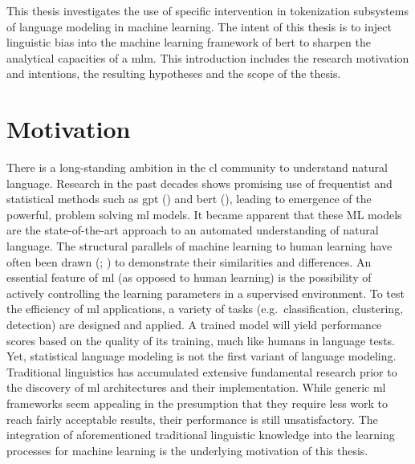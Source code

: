 
This thesis investigates the use of specific intervention in tokenization subsystems of language modeling in machine learning.
The intent of this thesis is to inject linguistic bias into the machine learning framework of \ac{bert} to sharpen the analytical capacities of a \ac{mlm}.
This introduction includes the research motivation and intentions, the resulting hypotheses and the scope of the thesis.

\section{Motivation}
\label{sec:motivation}
There is a long-standing ambition in the \acf{cl} community to understand natural language.
Research in the past decades shows promising use of frequentist and statistical methods such as \ac{gpt} (\cite{gpt}) and \ac{bert} (\cite{ATTENTION}), leading to emergence of the powerful, problem solving \ac{ml} models.
It became apparent that these ML models are the state-of-the-art approach to an automated understanding of natural language.
The structural parallels of machine learning to human learning have often been drawn (\textcite{humanmachinelearning1}; \textcite{humanmachinelearning2}) to demonstrate their similarities and differences.
An essential feature of \ac{ml} (as opposed to human learning) is the possibility of actively controlling the learning parameters in a supervised environment.
To test the efficiency of  \ac{ml} applications, a variety of tasks (e.g.\ classification, clustering, detection) are designed and applied.
A trained model will yield performance scores based on the quality of its training, much like humans in language tests.
Yet, statistical language modeling is not the first variant of language modeling.
Traditional linguistics has accumulated extensive fundamental research prior to the discovery of \ac{ml} architectures and their implementation.
While generic \ac{ml} frameworks seem appealing in the presumption that they require less work to reach fairly acceptable results, their performance is still unsatisfactory.
The integration of aforementioned traditional linguistic knowledge into the learning processes for machine learning is the underlying motivation of this thesis.

